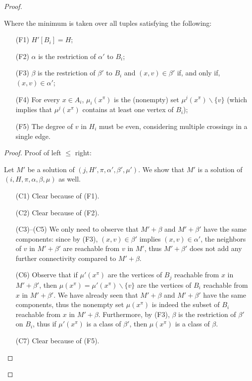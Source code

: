\begin{proof}
\begin{claim}
Where the minimum is taken over all tuples satisfying the following:

\begin{itemize}
    \item[(F1)] \(H'[B_i] = H\);
    \item[(F2)] \(\alpha\) is the restriction of \(\alpha'\) to \(B_i\);
    \item[(F3)] \(\beta\) is the restriction of \(\beta'\) to \(B_i\) and \((x, v) \in \beta'\) if, and only if, \((x, v) \in \alpha'\);
    \item[(F4)] For every \(x \in A_i\), \(\mu_i(x^\pi)\) is the (nonempty) set \(\mu^j(x^\pi) \backslash \{v\}\) (which implies that \(\mu^j(x^\pi)\) contains at least one vertex of \(B_i\));
    \item[(F5)] The degree of \(v\) in \(H_i\) must be even, considering multiple crossings in a single edge.

\end{itemize}

\end{claim}

\begin{proof}

Proof of left \(\leq\) right:

Let \(M'\) be a solution of \((j, H', \pi, \alpha', \beta', \mu')\). We show that \(M'\) is a solution of \((i, H, \pi, \alpha, \beta, \mu)\) as well.

\begin{itemize}
    \item[(C1)] Clear because of (F1).
    \item[(C2)] Clear because of (F2).
    \item[(C3)–(C5)] We only need to observe that \(M' + \beta\) and \(M' + \beta'\) have the same components: since by (F3), \((x, v) \in \beta'\) implies \((x, v) \in \alpha'\), the neighbors of \(v\) in \(M' + \beta'\) are reachable from \(v\) in \(M'\), thus \(M' + \beta'\) does not add any further connectivity compared to \(M' + \beta\).
    \item[(C6)] Observe that if \(\mu'(x^\pi)\) are the vertices of \(B_j\) reachable from \(x\) in \(M' + \beta'\), then \(\mu(x^\pi) = \mu'(x^\pi) \backslash \{v\}\) are the vertices of \(B_i\) reachable from \(x\) in \(M' + \beta'\). We have already seen that \(M' + \beta\) and \(M' + \beta'\) have the same components, thus the nonempty set \(\mu(x^\pi)\) is indeed the subset of \(B_i\) reachable from \(x\) in \(M' + \beta\). Furthermore, by (F3), \(\beta\) is the restriction of \(\beta'\) on \(B_i\), thus if \(\mu'(x^\pi)\) is a class of \(\beta'\), then \(\mu(x^\pi)\) is a class of \(\beta\).
    \item[(C7)] Clear because of (F5).
\end{itemize}


\end{proof}
\end{proof}
